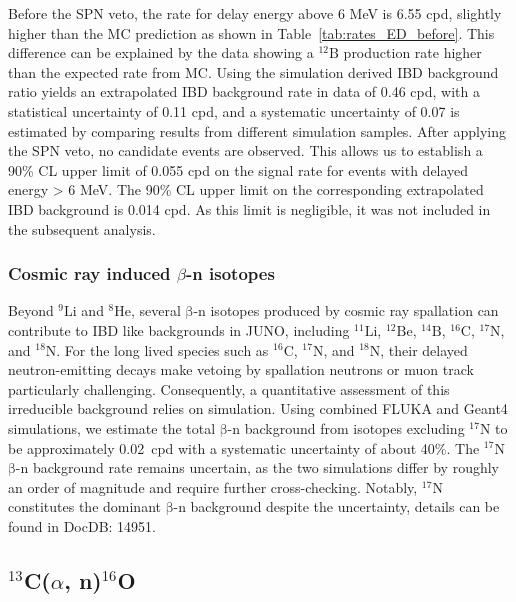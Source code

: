 Before the SPN veto, the rate for delay energy above 6 MeV is 6.55 cpd, slightly higher than the MC prediction as shown in Table~\ref{tab:rates_ED_before}. This difference can be explained by the data showing a $\mathrm{^{12}B}$ production rate higher than the expected rate from MC. Using the simulation derived IBD background ratio yields an extrapolated IBD background rate in data of 0.46 cpd, with a statistical uncertainty of 0.11 cpd, and a systematic uncertainty of 0.07 is estimated by comparing results from different simulation samples. 
After applying the SPN veto, no candidate events are observed. This allows us to establish a 90\% CL upper limit of 0.055 cpd on the signal rate for events with delayed energy > 6 MeV. The 90\% CL upper limit on the corresponding extrapolated IBD background is 0.014 cpd. As this limit is negligible, it was not included in the subsequent analysis.

\subsubsection{Cosmic ray induced ${\beta}$-n isotopes}
Beyond $\mathrm{^9Li}$ and $\mathrm{^8He}$, several $\mathrm{\beta}$-n isotopes produced by cosmic ray spallation can contribute to IBD like backgrounds in JUNO, including $\mathrm{^{11}Li}$, $\mathrm{^{12}Be}$, $\mathrm{^{14}B}$, $\mathrm{^{16}C}$, $\mathrm{^{17}N}$, and $\mathrm{^{18}N}$. For the long lived species such as $\mathrm{^{16}C}$, $\mathrm{^{17}N}$, and $\mathrm{^{18}N}$, their delayed neutron-emitting decays make vetoing by spallation neutrons or  muon track particularly challenging. Consequently, a quantitative assessment of this irreducible background relies on simulation. Using combined FLUKA and Geant4 simulations, we estimate the total $\mathrm{\beta}$-n background from isotopes excluding $\mathrm{^{17}N}$ to be approximately 0.02~cpd with a systematic uncertainty of about 40\%. The $\mathrm{^{17}N}$ $\mathrm{\beta}$-n background rate remains uncertain, as the two simulations differ by roughly an order of magnitude and require further cross-checking. Notably, $\mathrm{^{17}N}$ constitutes the dominant $\mathrm{\beta}$-n background despite the uncertainty, details can be found in DocDB: 14951.


\subsection{$^{13}$C($\alpha$, n)$^{16}$O}

